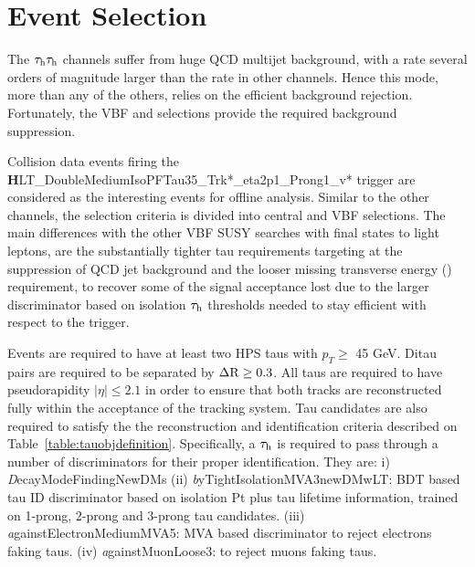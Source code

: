 
\clearpage

\section{Event Selection}

The $\tau_{\text{h}}\tau_{\text{h}}$ channels suffer from huge QCD multijet background, with a rate several orders of magnitude larger than the rate in other channels.  Hence this mode, more than any of the others, relies on the efficient background rejection. Fortunately, the VBF and \met selections provide the required background suppression.

Collision data events firing the {\textbf HLT\_DoubleMediumIsoPFTau35\_Trk*\_eta2p1\_Prong1\_v*} 
trigger are considered as the interesting events 
for offline analysis. 
Similar to the other channels, the selection criteria is divided into central and VBF selections. 
The main differences with the other VBF SUSY searches with final states to light leptons, are the substantially tighter tau requirements targeting at the suppression of QCD jet background and the looser missing transverse energy (\met) requirement, to recover some of the signal acceptance lost due to the larger discriminator based on isolation
$\tau_{\text{h}}$ \pt thresholds needed to stay efficient with respect to the trigger.  

Events are required to have at least two HPS taus with $p_{T} \ge$ 45 GeV. Ditau pairs are required to be separated by $\Delta \text{R} \ge 0.3$. All taus are required to have pseudorapidity $|\eta| \le 2.1$ in order to ensure that both tracks are reconstructed fully within the acceptance of the tracking system. Tau candidates are also required to satisfy the the reconstruction and identification criteria described on Table~\ref{table:tauobjdefinition}. Specifically, a $\tau_{\text{h}}$ is required to pass through a number of discriminators for their proper identification. They are:
i) {\textit DecayModeFindingNewDMs} (ii) {\textit byTightIsolationMVA3newDMwLT}: BDT based tau ID discriminator based on isolation Pt plus tau lifetime information, trained on 1-prong, 2-prong and 3-prong tau candidates. (iii) {\textit againstElectronMediumMVA5}: MVA based discriminator to reject electrons faking taus. (iv) {\textit againstMuonLoose3}: to reject muons faking taus.

